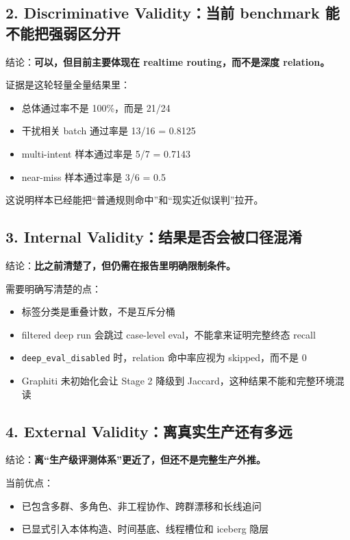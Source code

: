 \documentclass[11pt]{article}
\begin{document}
\subsection{2. Discriminative Validity：当前 benchmark 能不能把强弱区分开}

结论：\textbf{可以，但目前主要体现在 realtime routing，而不是深度 relation。}

证据是这轮轻量全量结果里：
\begin{itemize}
\item 总体通过率不是 100\%，而是 21/24
\item 干扰相关 batch 通过率是 13/16 = 0.8125
\item multi-intent 样本通过率是 5/7 = 0.7143
\item near-miss 样本通过率是 3/6 = 0.5
\end{itemize}

这说明样本已经能把“普通规则命中”和“现实近似误判”拉开。

\subsection{3. Internal Validity：结果是否会被口径混淆}

结论：\textbf{比之前清楚了，但仍需在报告里明确限制条件。}

需要明确写清楚的点：
\begin{itemize}
\item 标签分类是重叠计数，不是互斥分桶
\item filtered deep run 会跳过 case-level eval，不能拿来证明完整终态 recall
\item \texttt{deep\_eval\_disabled} 时，relation 命中率应视为 skipped，而不是 0
\item Graphiti 未初始化会让 Stage 2 降级到 Jaccard，这种结果不能和完整环境混读
\end{itemize}

\subsection{4. External Validity：离真实生产还有多远}

结论：\textbf{离“生产级评测体系”更近了，但还不是完整生产外推。}

当前优点：
\begin{itemize}
\item 已包含多群、多角色、非工程协作、跨群漂移和长线追问
\item 已显式引入本体构造、时间基底、线程槽位和 iceberg 隐层
\end{itemize}
\end{document}
